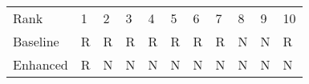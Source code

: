 \begin{tabular}{lllllllllll}
Rank & 1 & 2 & 3 & 4 & 5 & 6 & 7 & 8 & 9 & 10 \\
Baseline & R & R & R & R & R & R & R & N & N & R \\
Enhanced & R & N & N & N & N & N & N & N & N & N \\
\end{tabular}
